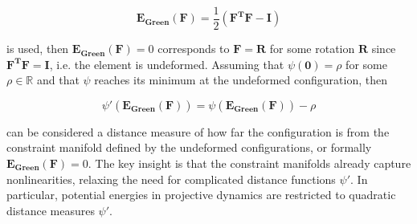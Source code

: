 \documentclass{article}
\begin{document}
\[
\bm{E_{\text{Green}}}(\bm{F}) = \frac{1}{2}(\bm{F^TF} - \bm{I})
\]

is used, then $\bm{E_{\text{Green}}}(\bm{F}) = 0$ corresponds to $\bm{F} = \bm{R}$ for some rotation $\bm{R}$ since $\bm{F^TF} = \bm{I}$, i.e.
the element is undeformed. Assuming that $\psi(\bm{0}) = \rho$ for some $\rho \in \mathbb{R}$ and that $\psi$ reaches its minimum at the undeformed
configuration, then 

\[
    \psi\prime(\bm{E_{\text{Green}}}(\bm{F})) = \psi(\bm{E_{\text{Green}}}(\bm{F})) - \rho
\]

can be considered a distance measure of how far the configuration is from the constraint manifold defined by the undeformed configurations, or 
formally $\bm{E_{\text{Green}}}(\bm{F}) = 0$. The key insight is that the constraint manifolds already capture nonlinearities, relaxing the need
for complicated distance functions $\psi\prime$. In particular, potential energies in projective dynamics are restricted to quadratic distance 
measures $\psi\prime$.
\end{document}
